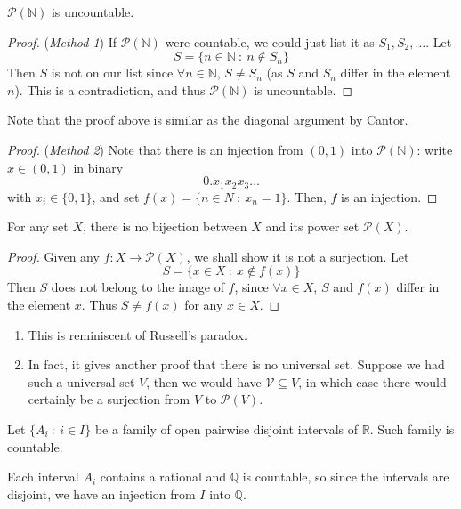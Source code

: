 \documentclass[10pt, a4paper, twoside]{report}
\begin{document}
\begin{theorem}
    \(\mathcal{P}(\mathbb{N})\) is uncountable.
    \label{thm:uncountable_powern}
\end{theorem}
\begin{proof}
    (\emph{Method 1}) If \(\mathcal{P}(\mathbb{N})\) were countable, we could just list it as \(S_1,S_2,\ldots\). Let 
    \[S=\{n\in\mathbb{N}\::\:n\notin S_n\}\]
    Then \(S\) is not on our list since \(\forall n\in\mathbb{N}\), \(S\neq S_n\) (as \(S\) and \(S_n\) differ in the element \(n\)). This is a contradiction, and thus \(\mathcal{P}(\mathbb{N})\) is uncountable.
\end{proof}
Note that the proof above is similar as the diagonal argument by Cantor.
\begin{proof}
    (\emph{Method 2}) Note that there is an injection from \((0,1)\) into \(\mathcal{P}(\mathbb{N})\): write \(x\in(0,1)\) in binary 
    \[0.x_1x_2x_3\ldots\]
    with \(x_i\in\{0,1\}\), and set \(f(x)=\{n\in N\::\:x_n=1\}\). Then, \(f\) is an injection.
\end{proof}
\begin{theorem}
    For any set \(X\), there is no bijection between \(X\) and its power set \(\mathcal{P}(X)\).
\end{theorem}
\begin{proof}
    Given any \(f:X\to\mathcal{P}(X)\), we shall show it is not a surjection. Let
    \[S=\{x\in X\::\:x\notin f(x)\}\]
    Then \(S\) does not belong to the image of \(f\), since \(\forall x\in X\), \(S\) and \(f(x)\) differ in the element \(x\). Thus \(S\neq f(x)\) for any \(x\in X\).
\end{proof}
\begin{remark} \item[]
    \begin{enumerate}
        \item This is reminiscent of Russell's paradox.
        \item In fact, it gives another proof that there is no universal set. Suppose we had such a universal set \(V\), then we would have \(\mathcal{V}\subseteq V\), in which case there would certainly be a surjection from \(V\) to \(\mathcal{P}(V)\).
    \end{enumerate}
\end{remark}
\begin{example}
    Let \(\{A_i\::\:i\in I\}\) be a family of open pairwise disjoint intervals of \(\mathbb{R}\). Such family is countable. 

    Each interval \(A_i\) contains a rational and \(\mathbb{Q}\) is countable, so since the intervals are disjoint, we have an injection from \(I\) into \(\mathbb{Q}\).
\end{example}
\end{document}
